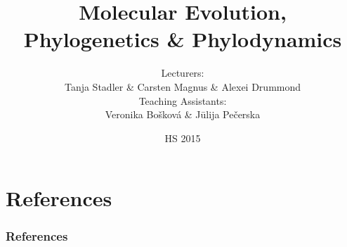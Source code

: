 \documentclass[xcolor=pdftex,dvipsnames,table,10pt]{beamer}
\author[]{Lecturers: \\ Tanja Stadler \& Carsten Magnus \& Alexei Drummond \\ \bigskip Teaching Assistants: \\  Veronika Bo\v{s}kov\'{a} \& J\={u}lija Pe\v{c}erska}
\institute{Computational Evolution \\ Department of Biosystems Science and Engineering}
\title[MEPP]{Molecular Evolution, \\ Phylogenetics \& Phylodynamics}
\date{HS 2015}
\begin{document}
\begin{frame}
  \titlepage
\end{frame}



\section{References}
\begin{frame}[t,allowframebreaks]\frametitle{References}

\tiny
\end{frame}
\end{document}
